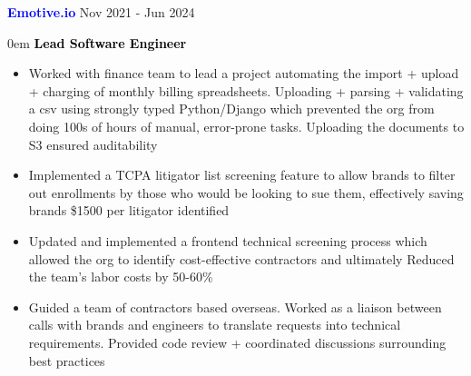 \documentclass[11pt]{resume}
\begin{document}
    \noindent\begin{minipage}[t]{1\textwidth}
      {\bf \textcolor{blue} {\large{Emotive.io}}} \hfill Nov 2021 - Jun 2024
      \vspace{.5em}

      \begin{addmargin}[.5em]{0em}
        \large{{\bf \textcolor{black}{Lead Software Engineer}}}
        \vspace{-.5em}
        \begin{itemize}
            \setlength\itemsep{-.1em}

            \item {Worked with finance team to lead a project automating the
              import + upload + charging of monthly billing spreadsheets.
              Uploading + parsing + validating a csv using strongly typed
              Python/Django which prevented the org from doing 100s of hours of
              manual, error-prone tasks. Uploading the documents to S3 ensured
              auditability}

            \item {Implemented a TCPA litigator list screening feature to allow
              brands to filter out enrollments by those who would be looking to
              sue them, effectively saving brands \$1500 per litigator
              identified}

            \item {Updated and implemented a frontend technical screening
              process which allowed the org to identify cost-effective
              contractors and ultimately Reduced the team's labor costs by
              50-60\%}

            \item {Guided a team of contractors based overseas. Worked as a
              liaison between calls with brands and engineers to translate
              requests into technical requirements. Provided code review +
              coordinated discussions surrounding best practices}

        \end{itemize}
      \end{addmargin}
    \end{minipage}

    \vspace{1em}
\end{document}
